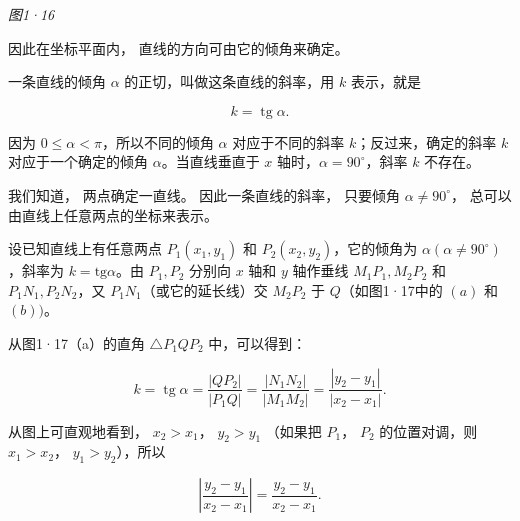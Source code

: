 \emph{图1·16}

因此在坐标平面内， 直线的方向可由它的倾角来确定。

一条直线的倾角 \(\alpha\) 的正切，叫做这条直线的斜率，用 \(k\)
表示，就是

\[
k = \operatorname{tg} \alpha.
\]

因为 \(0 \leqslant \alpha < \pi\)，所以不同的倾角 \(\alpha\)
对应于不同的斜率 \(k\)；反过来，确定的斜率 \(k\) 对应于一个确定的倾角
\(\alpha\)。当直线垂直于 \(x\) 轴时，\(\alpha = 90^\circ\)，斜率 \(k\)
不存在。

我们知道， 两点确定一直线。 因此一条直线的斜率， 只要倾角
\(\alpha \neq 90^{\circ}\)， 总可以由直线上任意两点的坐标来表示。

设已知直线上有任意两点 \(P_{1}(x_{1},y_{1})\) 和
\(P_2(x_2,y_2)\)，它的倾角为 \(\alpha (\alpha \neq 90^{\circ})\)，斜率为
\(k = \mathrm{tg}\alpha\)。由 \(P_{1}, P_{2}\) 分别向 \(x\) 轴和 \(y\)
轴作垂线 \(M_{1}P_{1}, M_{2}P_{2}\) 和 \(P_{1}N_{1}, P_{2}N_{2}\)，又
\(P_{1}N_{1}\)（或它的延长线）交 \(M_{2}P_{2}\) 于 \(Q\)（如图1·17中的
\((a)\) 和 \((b))\)。

从图1·17（a）的直角 \(\triangle P_{1}QP_{2}\) 中，可以得到：

\[
k = \operatorname{tg} \alpha = \frac {\left| QP_{2} \right|}{\left| P_{1} Q \right|} = \frac {\left| N_{1} N_{2} \right|}{\left| M_{1} M_{2} \right|} = \frac {\left| y_{2} - y_{1} \right|}{\left| x_{2} - x_{1} \right|}.
\]

从图上可直观地看到， \(x_{2}>x_{1}\)， \(y_{2}>y_{1}\) （如果把
\(P_{1}\)， \(P_{2}\) 的位置对调，则 \(x_{1}>x_{2}\)，
\(y_{1}>y_{2}\)），所以

\[
\left| \frac {y_{2} - y_{1}}{x_{2} - x_{1}} \right| = \frac {y_{2} - y_{1}}{x_{2} - x_{1}}.
\]

